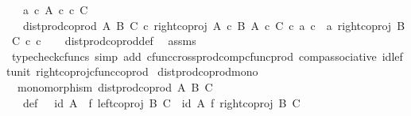 \begin{isabellebody}
\ \ \ {\isachardoublequoteopen}a\ {\isasymin}\isactrlsub c\ A{\isachardoublequoteclose}\ {\isachardoublequoteopen}c\ {\isasymin}\isactrlsub c\ C{\isachardoublequoteclose}\isanewline
\ \ \ {\isachardoublequoteopen}dist{\isacharunderscore}{\kern0pt}prod{\isacharunderscore}{\kern0pt}coprod\ A\ B\ C\ {\isasymcirc}\isactrlsub c\ right{\isacharunderscore}{\kern0pt}coproj\ {\isacharparenleft}{\kern0pt}A\ {\isasymtimes}\isactrlsub c\ B{\isacharparenright}{\kern0pt}\ {\isacharparenleft}{\kern0pt}A\ {\isasymtimes}\isactrlsub c\ C{\isacharparenright}{\kern0pt}\ {\isasymcirc}\isactrlsub c\ {\isasymlangle}a{\isacharcomma}{\kern0pt}\ c{\isasymrangle}\ {\isacharequal}{\kern0pt}\ {\isasymlangle}a{\isacharcomma}{\kern0pt}\ right{\isacharunderscore}{\kern0pt}coproj\ B\ C\ {\isasymcirc}\isactrlsub c\ c{\isasymrangle}{\isachardoublequoteclose}\isanewline
%
\isadelimproof
\ \ %
\endisadelimproof
%
\isatagproof
{}\isamarkupfalse%
\ dist{\isacharunderscore}{\kern0pt}prod{\isacharunderscore}{\kern0pt}coprod{\isacharunderscore}{\kern0pt}def\ \isamarkupfalse%
\ assms\ \isanewline
\ \ \isamarkupfalse%
\ {\isacharparenleft}{\kern0pt}typecheck{\isacharunderscore}{\kern0pt}cfuncs{\isacharcomma}{\kern0pt}\ simp\ add{\isacharcolon}{\kern0pt}\ cfunc{\isacharunderscore}{\kern0pt}cross{\isacharunderscore}{\kern0pt}prod{\isacharunderscore}{\kern0pt}comp{\isacharunderscore}{\kern0pt}cfunc{\isacharunderscore}{\kern0pt}prod\ comp{\isacharunderscore}{\kern0pt}associative{}\ id{\isacharunderscore}{\kern0pt}left{\isacharunderscore}{\kern0pt}unit{}\ right{\isacharunderscore}{\kern0pt}coproj{\isacharunderscore}{\kern0pt}cfunc{\isacharunderscore}{\kern0pt}coprod{\isacharparenright}{\kern0pt}%
\endisatagproof
{\isafoldproof}%
%
\isadelimproof
\isanewline
%
\endisadelimproof
\isanewline
{}\isamarkupfalse%
\ dist{\isacharunderscore}{\kern0pt}prod{\isacharunderscore}{\kern0pt}coprod{\isacharunderscore}{\kern0pt}mono{\isacharcolon}{\kern0pt}\isanewline
\ \ {\isachardoublequoteopen}monomorphism\ {\isacharparenleft}{\kern0pt}dist{\isacharunderscore}{\kern0pt}prod{\isacharunderscore}{\kern0pt}coprod\ A\ B\ C{\isacharparenright}{\kern0pt}{\isachardoublequoteclose}\isanewline
%
\isadelimproof
%
\endisadelimproof
%
\isatagproof
{}\isamarkupfalse%
\ {\isacharminus}{\kern0pt}\isanewline
\ \ \isamarkupfalse%
\ {\isasymphi}\ \ {\isasymphi}{\isacharunderscore}{\kern0pt}def{\isacharcolon}{\kern0pt}\ {\isachardoublequoteopen}{\isasymphi}\ {\isacharequal}{\kern0pt}\ {\isacharparenleft}{\kern0pt}id\ A\ \ {\isasymtimes}\isactrlsub f\ left{\isacharunderscore}{\kern0pt}coproj\ B\ C{\isacharparenright}{\kern0pt}\ {\isasymamalg}\ {\isacharparenleft}{\kern0pt}id\ A\ {\isasymtimes}\isactrlsub f\ right{\isacharunderscore}{\kern0pt}coproj\ B\ C{\isacharparenright}{\kern0pt}{\isachardoublequoteclose}\ \isanewline

\end{isabellebody}
